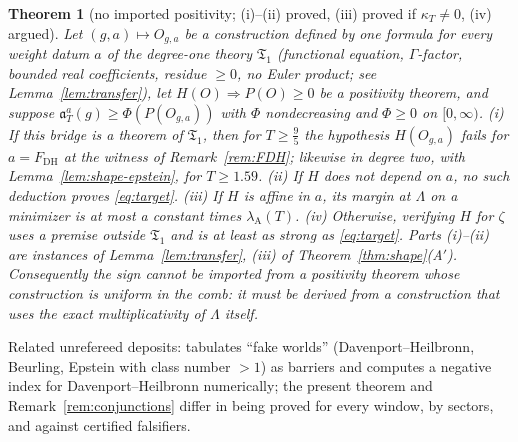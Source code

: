 \documentclass[11pt]{amsart}
\newtheorem{theorem}{Theorem}[section]
\theoremstyle{definition}
\theoremstyle{remark}
\newcommand{\lamA}{\lambda_{\mathrm A}(T)}
\begin{document}
\begin{theorem}[no imported positivity; (i)--(ii) proved, (iii) proved if $\kappa_T\ne0$, (iv) argued]\label{thm:noimport}
Let $(g,a)\mapsto O_{g,a}$ be a construction defined by one formula for every weight datum $a$ of the degree-one theory
$\mathfrak T_1$ (functional equation, $\Gamma$-factor, bounded real coefficients, residue $\ge0$, no Euler product; see
Lemma~\ref{lem:transfer}), let $H(O)\Rightarrow P(O)\ge0$ be a positivity theorem, and suppose
$\mathfrak a_T^a(g)\ge\Phi(P(O_{g,a}))$ with $\Phi$ nondecreasing and $\Phi\ge0$ on $[0,\infty)$.
(i) If this bridge is a theorem of $\mathfrak T_1$, then for $T\ge\frac95$ the hypothesis $H(O_{g,a})$ fails for
$a=F_{\mathrm{DH}}$ at the witness of Remark~\ref{rem:FDH}; likewise in degree two, with Lemma~\ref{lem:shape-epstein}, for
$T\ge1.59$. (ii) If $H$ does not depend on $a$, no such deduction proves \eqref{eq:target}. (iii) If $H$ is affine in $a$,
its margin at $\Lambda$ on a minimizer is at most a constant times $\lamA$. (iv) Otherwise, verifying $H$ for $\zeta$ uses a
premise outside $\mathfrak T_1$ and is at least as strong as \eqref{eq:target}. Parts (i)--(ii) are instances of
Lemma~\ref{lem:transfer}, (iii) of Theorem~\ref{thm:shape}(A$'$). Consequently the sign cannot be imported from a positivity
theorem whose construction is uniform in the comb: it must be derived from a construction that uses the exact
multiplicativity of $\Lambda$ itself.
\end{theorem}
Related unrefereed deposits: \cite{Eberwein2026} tabulates ``fake worlds'' (Davenport--Heilbronn, Beurling, Epstein with class number $>1$) as barriers and computes a negative index for Davenport--Heilbronn numerically; the present theorem and Remark~\ref{rem:conjunctions} differ in being proved for every window, by sectors, and against certified falsifiers.
\end{document}

